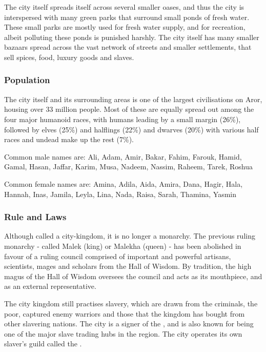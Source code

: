 The city itself spreads itself across several smaller oases, and thus the city
is interspersed with many green parks that surround small ponds of fresh
water. These small parks are mostly used for fresh water supply, and for
recreation, albeit polluting these ponds is punished harshly. The city itself
has many smaller bazaars spread across the vast network of streets and smaller
settlements, that sell spices, food, luxury goods and slaves.

\subsubsection{Population}

The city itself and its surrounding areas is one of the largest civilisations
on Aror, housing over 33 million people. Most of these are equally spread out
among the four major humanoid races, with humans leading by a small margin
(26\%), followed by elves (25\%) and halflings (22\%) and dwarves (20\%) with
various half races and undead make up the rest (7\%).

Common male names are: Ali, Adam, Amir, Bakar, Fahim, Farouk, Hamid, Gamal,
Hasan, Jaffar, Karim, Musa, Nadeem, Nassim, Raheem, Tarek, Roshua

Common female names are: Amina, Adila, Aida, Amira, Dana, Hagir, Hala, Hannah,
Inas, Jamila, Leyla, Lina, Nada, Raisa, Sarah, Thamina, Yasmin

\subsubsection{Rule and Laws}

Although called a city-kingdom, it is no longer a monarchy. The previous ruling
monarchy - called Malek (king) or Malekha (queen) - has been abolished in
favour of a ruling council comprised of important and powerful artisans,
scientists, mages and scholars from the Hall of Wisdom. By tradition, the high
magus of the Hall of Wisdom oversees the council and acts as its mouthpiece,
and as an external representative.

The city kingdom still practises slavery, which are drawn from the criminals,
the poor, captured enemy warriors and those that the kingdom has bought from
other slavering nations. The city is a signer of the , and is also known for being one of the major slave trading hubs in
the region. The city operates its own slaver's guild called the
.

